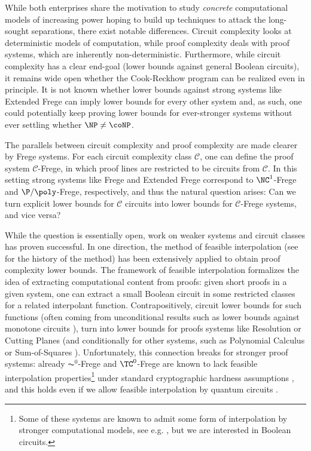 \documentclass[11pt]{article}
\theoremstyle{definition}
\theoremstyle{plain}
\theoremstyle{remark}
\newcommand{\calC}{\mathcal{C}}
\begin{document}
While both enterprises share the motivation to study \emph{concrete} computational models of increasing power hoping to build up techniques to attack the long-sought separations, there exist notable differences. Circuit complexity looks at deterministic models of computation, while proof complexity deals with proof systems, which are inherently non-deterministic. Furthermore, while circuit complexity has a clear end-goal (lower bounds against general Boolean circuits), it remains wide open whether the Cook-Reckhow program can be realized even in principle. It is not known whether lower bounds against strong systems like Extended Frege can imply lower bounds for every other system and, as such, one could potentially keep proving lower bounds for ever-stronger systems without ever settling whether $\NP \neq \coNP$.

The parallels between circuit complexity and proof complexity are made clearer by Frege systems. For each circuit complexity class $\calC$, one can define the proof system $\calC$-Frege, in which proof lines are restricted to be circuits from $\calC$. In this setting strong systems like Frege and Extended Frege correspond to $\NC^1$-Frege and $\P/\poly$-Frege, respectively, and thus the natural question arises: Can we turn explicit lower bounds for $\calC$ circuits into lower bounds for $\calC$-Frege systems, and vice versa?

While the question is essentially open, work on weaker systems and circuit classes has proven successful. In one direction, the method of feasible interpolation \cite{Kra94-PHP, Razb95, Kra97} (see \cite[§17.9.1]{krajicekBOOK} for the history of the method) has been extensively applied to obtain proof complexity lower bounds. The framework of feasible interpolation formalizes the idea of extracting computational content from proofs: given short proofs in a given system, one can extract a small Boolean circuit in some restricted classes for a related interpolant function. Contrapositively, circuit lower bounds for such functions (often coming from unconditional results such as lower bounds against monotone circuits \cite{Razb85, And85, AB87}), turn into lower bounds for proofs systems like Resolution \cite{Kra97} or Cutting Planes \cite{Pud97} (and conditionally for other systems, such as Polynomial Calculus or Sum-of-Squares \cite{Hak20}). Unfortunately, this connection breaks for stronger proof systems: already $\AC^0$-Frege and $\TC^0$-Frege are known to lack feasible interpolation properties\footnote{Some of these systems are known to admit some form of interpolation by stronger computational models, see e.g. \cite{Pud20, DR23}, but we are interested in Boolean circuits.} under standard cryptographic hardness assumptions \cite{KP98, BPR1997, BDGMP04}, and this holds even if we allow feasible interpolation by quantum circuits \cite{ ACG24}.
\end{document}
